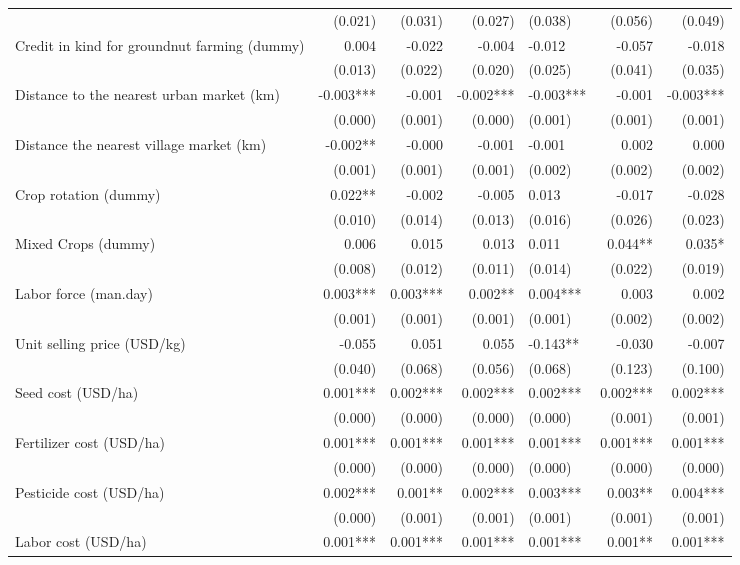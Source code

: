 \documentclass[
]{article}
\begin{document}
\begin{landscape}
\begin{longtable}[t]{lrrrlrr}
 & (0.021) & (0.031) & (0.027) & (0.038) & (0.056) & (0.049)\\
Credit in kind for groundnut farming (dummy) & 0.004 & -0.022 & -0.004 & -0.012 & -0.057 & -0.018\\
 & (0.013) & (0.022) & (0.020) & (0.025) & (0.041) & (0.035)\\
Distance to the nearest urban market (km) & -0.003*** & -0.001 & -0.002*** & -0.003*** & -0.001 & -0.003***\\
\addlinespace
 & (0.000) & (0.001) & (0.000) & (0.001) & (0.001) & (0.001)\\
Distance the nearest village market (km) & -0.002** & -0.000 & -0.001 & -0.001 & 0.002 & 0.000\\
 & (0.001) & (0.001) & (0.001) & (0.002) & (0.002) & (0.002)\\
Crop rotation (dummy) & 0.022** & -0.002 & -0.005 & 0.013 & -0.017 & -0.028\\
 & (0.010) & (0.014) & (0.013) & (0.016) & (0.026) & (0.023)\\
\addlinespace
Mixed Crops (dummy) & 0.006 & 0.015 & 0.013 & 0.011 & 0.044** & 0.035*\\
 & (0.008) & (0.012) & (0.011) & (0.014) & (0.022) & (0.019)\\
Labor force (man.day) & 0.003*** & 0.003*** & 0.002** & 0.004*** & 0.003 & 0.002\\
 & (0.001) & (0.001) & (0.001) & (0.001) & (0.002) & (0.002)\\
Unit selling price (USD/kg) & -0.055 & 0.051 & 0.055 & -0.143** & -0.030 & -0.007\\
\addlinespace
 & (0.040) & (0.068) & (0.056) & (0.068) & (0.123) & (0.100)\\
Seed cost (USD/ha) & 0.001*** & 0.002*** & 0.002*** & 0.002*** & 0.002*** & 0.002***\\
 & (0.000) & (0.000) & (0.000) & (0.000) & (0.001) & (0.001)\\
Fertilizer cost (USD/ha) & 0.001*** & 0.001*** & 0.001*** & 0.001*** & 0.001*** & 0.001***\\
 & (0.000) & (0.000) & (0.000) & (0.000) & (0.000) & (0.000)\\
\addlinespace
Pesticide cost (USD/ha) & 0.002*** & 0.001** & 0.002*** & 0.003*** & 0.003** & 0.004***\\
 & (0.000) & (0.001) & (0.001) & (0.001) & (0.001) & (0.001)\\
Labor cost (USD/ha) & 0.001*** & 0.001*** & 0.001*** & 0.001*** & 0.001** & 0.001***\\

\end{longtable}
\end{landscape}
\end{document}
